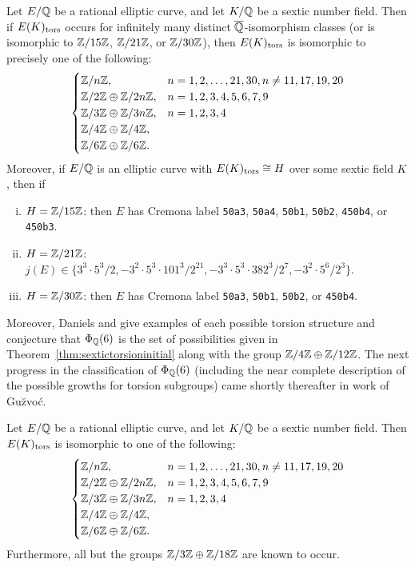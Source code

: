 \begin{thm} \label{thm:sextictorsioninitial}
Let $E/\mathbb{Q}$ be a rational elliptic curve, and let $K/\mathbb{Q}$ be a sextic number field. Then if $E(K)_{\text{tors}}$ occurs for infinitely many distinct $\overline{\mathbb{Q}}$-isomorphism classes (or is isomorphic to $\mathbb{Z}/15\mathbb{Z}$, $\mathbb{Z}/21\mathbb{Z}$, or $\mathbb{Z}/30\mathbb{Z}$), then $E(K)_{\text{tors}}$ is isomorphic to precisely one of the following:
	\[
	\begin{cases}
	\mathbb{Z}/n\mathbb{Z}, & n= 1, 2, \ldots, 21, 30, n \neq 11, 17, 19, 20 \\
	\mathbb{Z}/2\mathbb{Z} \oplus \mathbb{Z}/2n\mathbb{Z}, & n= 1, 2, 3, 4, 5, 6, 7, 9 \\
	\mathbb{Z}/3\mathbb{Z} \oplus \mathbb{Z}/3n\mathbb{Z}, & n= 1, 2, 3, 4 \\
	\mathbb{Z}/4\mathbb{Z} \oplus \mathbb{Z}/4\mathbb{Z}, \\
	\mathbb{Z}/6\mathbb{Z} \oplus \mathbb{Z}/6\mathbb{Z}.
	\end{cases}
	\]
Moreover, if $E/\mathbb{Q}$ is an elliptic curve with $E(K)_{\text{tors}} \cong H$ over some sextic field $K$, then if
	\begin{enumerate}[(i)]
	\item $H= \mathbb{Z}/15\mathbb{Z}$: then $E$ has Cremona label \texttt{50a3}, \texttt{50a4}, \texttt{50b1}, \texttt{50b2}, \texttt{450b4}, or \texttt{450b3}.
	\item $H= \mathbb{Z}/21\mathbb{Z}$: $j(E) \in \{ 3^3 \cdot 5^3/2, -3^2 \cdot 5^3 \cdot 101^3/2^{21}, -3^3 \cdot 5^3 \cdot 382^3/2^7, -3^2 \cdot 5^6/2^3 \}$.
	\item $H= \mathbb{Z}/30\mathbb{Z}$: then $E$ has Cremona label \texttt{50a3}, \texttt{50b1}, \texttt{50b2}, or \texttt{450b4}. 
	\end{enumerate}
\end{thm}


Moreover, Daniels and \gonjim{} give examples of each possible torsion structure and conjecture that $\Phi_{\mathbb{Q}}(6)$ is the set of possibilities given in Theorem~\ref{thm:sextictorsioninitial} along with the group $\mathbb{Z}/4\mathbb{Z} \oplus \mathbb{Z}/12\mathbb{Z}$. The next progress in the classification of $\Phi_{\mathbb{Q}}(6)$ (including the near complete description of the possible growths for torsion subgroups) came shortly thereafter in work of Gu\u{z}vo\'c.


\begin{thm}
Let $E/\mathbb{Q}$ be a rational elliptic curve, and let $K/\mathbb{Q}$ be a sextic number field. Then $E(K)_{\text{tors}}$ is isomorphic to one of the following:
	\[
	\begin{cases}
	\mathbb{Z}/n\mathbb{Z}, & n= 1, 2, \ldots, 21, 30, n \neq 11, 17, 19, 20 \\
	\mathbb{Z}/2\mathbb{Z} \oplus \mathbb{Z}/2n\mathbb{Z}, & n= 1, 2, 3, 4, 5, 6, 7, 9 \\
	\mathbb{Z}/3\mathbb{Z} \oplus \mathbb{Z}/3n\mathbb{Z}, & n= 1, 2, 3, 4 \\
	\mathbb{Z}/4\mathbb{Z} \oplus \mathbb{Z}/4\mathbb{Z}, \\
	\mathbb{Z}/6\mathbb{Z} \oplus \mathbb{Z}/6\mathbb{Z}.
	\end{cases}
	\]
Furthermore, all but the groups $\mathbb{Z}/3\mathbb{Z} \oplus \mathbb{Z}/18\mathbb{Z}$ are known to occur. 	
\end{thm}


